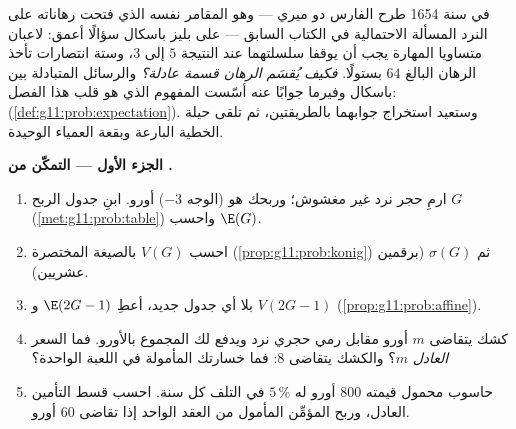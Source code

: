 \begin{problem}
\label{pb:g11:prob:1}
في سنة 1654 طرح الفارس دو ميري --- وهو المقامر نفسه الذي فتحت
رهاناته على النرد المسألة الاحتمالية في الكتاب السابق ---
على بليز باسكال سؤالًا أعمق: لاعبان متساويا المهارة
يجب أن يوقفا سلسلتهما عند النتيجة $5$ إلى $3$، وستة
انتصارات تأخذ الرهان البالغ $64$ بستولًا. \emph{فكيف يُقسَم الرهان
قسمة عادلة؟} والرسائل المتبادلة بين باسكال وفيرما جوابًا عنه
أسّست المفهوم الذي هو قلب هذا الفصل: 
(\cref{def:g11:prob:expectation}). وستعيد استخراج
جوابهما بالطريقتين، ثم تلقى حيلة الخطية البارعة وبقعة
 العمياء الوحيدة.

\medskip
\noindent\textbf{الجزء الأول --- التمكّن من .}
\begin{enumerate}
  \item ارمِ حجر نرد غير مغشوش؛ وربحك هو (الوجه $- 3$) أورو. ابنِ
        جدول  الربح $G$
        (\cref{met:g11:prob:table}) واحسب $\E(G)$.
  \item احسب $V(G)$ بالصيغة المختصرة
        (\cref{prop:g11:prob:konig}) ثم $\sigma(G)$ (برقمين
        عشريين).
  \item بلا أي جدول جديد، أعطِ $\E(2G - 1)$ و
        $V(2G - 1)$ (\cref{prop:g11:prob:affine}).
  \item كشك يتقاضى $m$ أورو مقابل رمي حجري نرد ويدفع
        لك المجموع بالأورو. فما السعر \emph{العادل}
        $m$؟ والكشك يتقاضى $8$: فما خسارتك المأمولة
        في اللعبة الواحدة؟
  \item حاسوب محمول قيمته $800$ أورو له  $5\,\%$ في
        التلف كل سنة. احسب قسط التأمين
        العادل، وربح المؤمِّن المأمول من العقد الواحد
        إذا تقاضى $60$ أورو.
\end{enumerate}


\end{problem}
